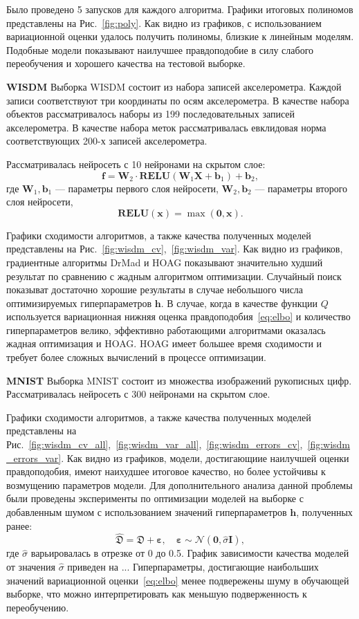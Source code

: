 Было проведено 5 запусков для каждого алгоритма.
Графики итоговых полиномов представлены на Рис.~\ref{fig:poly}. Как видно из графиков, с использованием вариационной оценки удалось получить полиномы, близкие к линейным моделям. Подобные модели показывают наилучшее правдоподобие в силу слабого переобучения и хорошего качества на тестовой выборке. 


\textbf{WISDM }
Выборка WISDM состоит из набора записей акселерометра. Каждой записи соответствуют три координаты по осям акселерометра. В качестве набора объектов рассматривалось наборы из 199 последовательных записей акселерометра. В качестве набора меток рассматривалась евклидовая норма соответствующих 200-х записей акселерометра.

Рассматривалась нейросеть с 10 нейронами на скрытом слое:
\[
    \mathbf{f} = \mathbf{W}_2 \cdot \textbf{RELU}(\mathbf{W}_1\mathbf{X} + \mathbf{b}_1) +\mathbf{b}_2,
\]
где $\mathbf{W}_1, \mathbf{b}_1$ --- параметры первого слоя нейросети,
$\mathbf{W}_2, \mathbf{b}_2$ --- параметры второго слоя нейросети,
\[
    \textbf{RELU}(\mathbf{x}) = \max(\mathbf{0}, \mathbf{x}).
\]

Графики сходимости алгоритмов, а также качества полученных моделей представлены на Рис.~\ref{fig:wisdm_cv},~\ref{fig:wisdm_var}.
Как видно из графиков, градиентные алгоритмы DrMad и HOAG показывают значительно худший результат по сравнению с жадным алгоритмом оптимизации. Случайный поиск показыват достаточно хорошие результаты в случае небольшого числа оптимизируемых гиперпараметров $\mathbf{h}$. В случае, когда в качестве функции $Q$ используется вариационная нижняя оценка правдоподобия~\eqref{eq:elbo} и количество гиперпараметров велико, эффективно работающими алгоритмами оказалась жадная оптимизация и HOAG. HOAG имеет большее время сходимости и требует более сложных вычислений в процессе оптимизации.


\textbf{MNIST}
Выборка MNIST состоит из множества изображений рукописных цифр.
Рассматривалась нейросеть с 300 нейронами на скрытом слое.

Графики сходимости алгоритмов, а также качества полученных моделей представлены на Рис.~\ref{fig:wisdm_cv_all},~\ref{fig:wisdm_var_all},~\ref{fig:wisdm_errors_cv},~\ref{fig:wisdm_errors_var}.
Как видно из графиков, модели, достигающиие наилучшей оценки правдоподобия, имеют наихудшее итоговое качество, но более устойчивы к возмущению параметров модели. Для дополнительного анализа данной проблемы были проведены эксперименты по оптимизации моделей на выборке с добавленным шумом с использованием значений гиперпараметров $\mathbf{h}$, полученных ранее:
\[
    \hat{\mathfrak{D}} = \mathfrak{D} + \boldsymbol{\varepsilon}, \quad   \boldsymbol{\varepsilon} \sim \mathcal{N}(\mathbf{0}, \hat{\sigma}\mathbf{I}),
\]
где $\hat{\sigma}$ варьировалась в отрезке от 0 до 0.5.
График зависимости качества моделей от значения $\hat{\sigma}$ приведен на ... Гиперпараметры, достигающие наибольших значений вариационной оценки~\eqref{eq:elbo} менее подвережены шуму в обучающей выборке, что можно интерпретировать как меньшую подверженность к переобучению.

